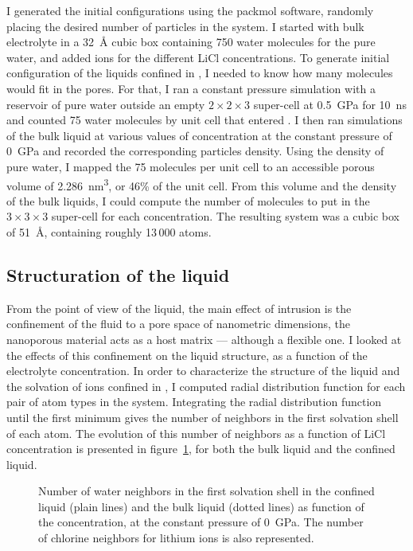 \documentclass[thesis]{subfiles}
\begin{document}
I generated the initial configurations using the packmol
software\cite{Martnez2009}, randomly placing the desired number of particles in
the system. I started with bulk electrolyte in a \SI{32}{\AA} cubic box
containing 750 water molecules for the pure water, and added ions for the
different LiCl concentrations. To generate initial configuration of the liquids
confined in , I needed to know how many molecules would fit in the 
pores. For that, I ran a constant pressure simulation with a reservoir of pure
water outside an empty $2\times2\times3$  super-cell at \SI{0.5}{GPa} for
\SI{10}{ns} and counted 75 water molecules by unit cell that entered . I
then ran simulations of the bulk liquid at various values of concentration at
the constant pressure of \SI{0}{GPa} and recorded the corresponding particles
density. Using the density of pure water, I mapped the 75 molecules per unit
cell to an accessible porous volume of \SI{2.286}{nm^3}, or 46\% of the unit
cell. From this volume and the density of the bulk liquids, I could compute the
number of molecules to put in the $3\times3\times3$ super-cell for each
concentration. The resulting system was a cubic box of \SI{51}{\AA}, containing
roughly 13\,000 atoms.

\subsection{Structuration of the liquid}
\label{sec:licl-zifliquid-structure}

From the point of view of the liquid, the main effect of intrusion is the
confinement of the fluid to a pore space of nanometric dimensions, \ie the
nanoporous material acts as a host matrix --- although a flexible one. I looked
at the effects of this confinement on the liquid structure, as a function of the
electrolyte concentration. In order to characterize the structure of the liquid
and the solvation of ions confined in , I computed radial distribution
function for each pair of atom types in the system. Integrating the radial
distribution function until the first minimum gives the number of neighbors in
the first solvation shell of each atom. The evolution of this number of
neighbors as a function of LiCl concentration is presented in
figure~\ref{fig:licl-zif:neighbors}, for both the bulk liquid and the confined
liquid.

\begin{figure}[ht]
    \centering
    
    \caption{Number of water neighbors in the first solvation shell in the
    confined liquid (plain lines) and the bulk liquid (dotted lines) as
    function of the concentration, at the constant pressure of \SI{0}{GPa}.
    The number of chlorine neighbors for lithium ions is also represented.}
    \label{fig:licl-zif:neighbors}
\end{figure}
\end{document}
